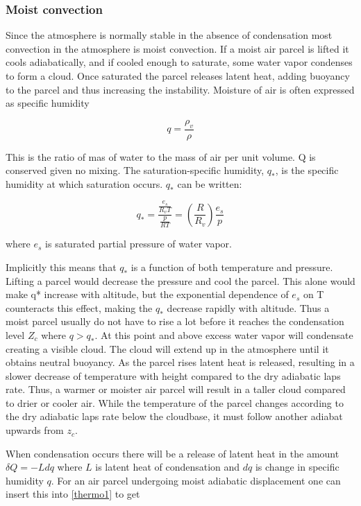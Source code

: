 \subsubsection{Moist convection}

Since the atmosphere is normally stable in the absence of condensation most convection in the atmosphere is moist convection. If a moist air parcel is lifted it cools adiabatically, and if cooled enough to saturate, some water vapor condenses to form a cloud. Once saturated the parcel releases latent heat, adding buoyancy to the parcel and thus increasing the instability.
Moisture of air is often expressed as specific humidity 

\begin{equation}
    q = \frac{\rho_v}{\rho}
\end{equation}

This is the ratio of mas of water to the mass of air per unit volume. Q is conserved given no mixing. The saturation-specific humidity, $q_*$, is the specific humidity at which saturation occurs. $q_*$ can be written:

\begin{equation}
    q_* = \frac{\frac{e_s}{R_v T}}{\frac{p}{RT}} = \left(\frac{R}{R_v}\right)\frac{e_s}{p}
    \label{qnote}
\end{equation}

where $e_s$ is saturated partial pressure of water vapor. 

Implicitly this means that $q_*$ is a function of both temperature and pressure. Lifting a parcel would decrease the pressure and cool the parcel. This alone would make q* increase with altitude, but the exponential dependence of $e_s$ on T counteracts this effect, making the $q_*$ decrease rapidly with altitude. Thus a moist parcel usually do not have to rise a lot before it reaches the condensation level $Z_c$ where $q>q_*$. At this point and above excess water vapor will condensate creating a visible cloud. The cloud will extend up in the atmosphere until it obtains neutral buoyancy. As the parcel rises latent heat is released, resulting in a slower decrease of temperature with height compared to the dry adiabatic laps rate.  Thus, a warmer or moister air parcel will result in a taller cloud compared to drier or cooler air. While the temperature of the parcel changes according to the dry adiabatic laps rate below the cloudbase, it must  follow another adiabat upwards from $z_c$. 

When condensation occurs there will be a release of latent heat in the amount $\delta Q = -L dq$ where $L$ is latent heat of condensation and $dq$ is change in specific humidity $q$. For an air parcel undergoing moist adiabatic displacement one can insert this into \eqref{thermo1} to get 

